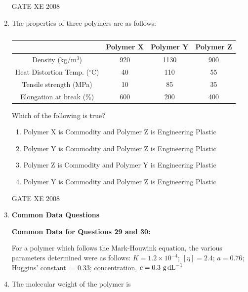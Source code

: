\documentclass[12pt]{article}
\begin{document}
\begin{enumerate}[label=Q\arabic*.]
GATE XE 2008

\item The properties of three polymers are as follows:

\begin{table}[H]     \centering     \caption{}     \label{}     \begin{tabular}{|c|c|c|c|}
\hline
 & \textbf{Polymer X} & \textbf{Polymer Y} & \textbf{Polymer Z} \\
\hline
Density (kg/m$^3$) & 920 & 1130 & 900 \\
Heat Distortion Temp. ($^\circ$C) & 40 & 110 & 55 \\
Tensile strength (MPa) & 10 & 85 & 35 \\
Elongation at break (\%) & 600 & 200 & 400 \\
\hline
\end{tabular} \end{table}

Which of the following is true? 

\begin{enumerate}[label=(\Alph*)]
\item  Polymer X is Commodity and Polymer Z is Engineering Plastic 
\item  Polymer Y is Commodity and Polymer Z is Engineering Plastic 
\item  Polymer Z is Commodity and Polymer Y is Engineering Plastic 
\item  Polymer Y is Commodity and Polymer Z is Engineering Plastic 
\end{enumerate}

GATE XE 2008

\item[] \textbf{\Large Common Data Questions}

\textbf{Common Data for Questions 29 and 30:}

 For a polymer which follows the Mark-Houwink equation, the various parameters determined were as follows:  
$K = 1.2 \times 10^{-4}$; $[\eta] = 2.4$; $a = 0.76$; Huggins' constant $= 0.33$; concentration, $c = 0.3\ \text{g\,dL}^{-1}$

\item The molecular weight of the polymer is  

\begin{enumerate}[label=(\Alph*)]
\end{enumerate}


\end{enumerate}
\end{document}
